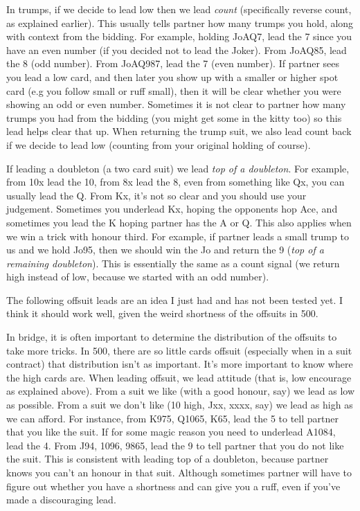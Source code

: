 \documentclass[a4paper]{JoshCards}
\begin{document}

In trumps, if we decide to lead low then we lead \textit{count} (specifically reverse count, as explained earlier). This usually tells partner how many trumps you hold, along with context from the bidding. For example, holding JoAQ7, lead the 7 since you have an even number (if you decided not to lead the Joker). From JoAQ85, lead the 8 (odd number). From JoAQ987, lead the 7 (even number). If partner sees you lead a low card, and then later you show up with a smaller or higher spot card (e.g you follow small or ruff small), then it will be clear whether you were showing an odd or even number. Sometimes it is not clear to partner how many trumps you had from the bidding (you might get some in the kitty too) so this lead helps clear that up. When returning the trump suit, we also lead count back if we decide to lead low (counting from your original holding of course).

If leading a doubleton (a two card suit) we lead \textit{top of a doubleton}. For example, from 10x lead the 10, from 8x lead the 8, even from something like Qx, you can usually lead the Q. From Kx, it's not so clear and you should use your judgement. Sometimes you underlead Kx, hoping the opponents hop Ace, and sometimes you lead the K hoping partner has the A or Q. This also applies when we win a  trick with honour third. For example, if partner leads a small trump to us and we hold Jo95, then we should win the Jo and return the 9 (\textit{top of a remaining doubleton}). This is essentially the same as a count signal (we return high instead of low, because we started with an odd number).


The following offsuit leads are an idea I just had and has not been tested yet. I think it should work well, given the weird shortness of the offsuits in 500.

In bridge, it is often important to determine the distribution of the offsuits to take more tricks. In 500, there are so little cards offsuit (especially when in a suit contract) that distribution isn't as important. It's more important to know where the high cards are. When leading offsuit, we lead attitude (that is, low encourage as explained above). From a suit we like (with a good honour, say) we lead as low as possible. From a suit we don't like (10 high, Jxx, xxxx, say) we lead as high as we can afford. For instance, from K975, Q1065, K65, lead the 5 to tell partner that you like the suit. If for some magic reason you need to underlead A1084, lead the 4. From J94, 1096, 9865, lead the 9 to tell partner that you do not like the suit. This is consistent with leading top of a doubleton, because partner knows you can't an honour in that suit. Although sometimes partner will have to figure out whether you have a shortness and can give you a ruff, even if you've made a discouraging lead.
\end{document}
